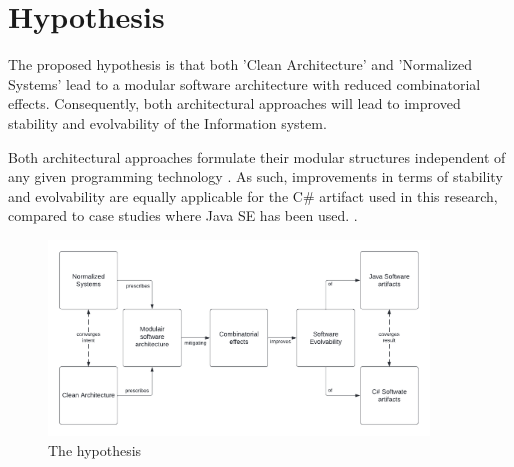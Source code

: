 \section{Hypothesis} \label{hypothesis} 

The proposed hypothesis is that both 'Clean Architecture' and 'Normalized Systems' lead
to a modular software architecture with reduced combinatorial effects. Consequently, both
architectural approaches will lead to improved stability and evolvability of the
Information system.

Both architectural approaches formulate their modular structures independent of any
given programming technology \parencite[]{mannaert_normalized_2009,martin_clean_2018}. As
such, improvements in terms of stability and evolvability are equally applicable for the
C\# artifact used in this research, compared to case studies where Java SE has been used.
\parencites[]{oorts_building_2014, de_bruyn_enabling_2018}.

\begin{figure}[!ht]
    \centering
    \includegraphics[width=0.9\textwidth]{Figures/hypothesis.pdf}
    \caption[The hypothesis]{The hypothesis}
    \label{fig_hypothesis}
\end{figure}